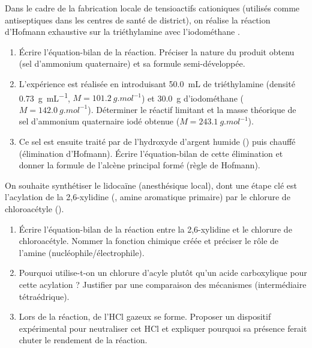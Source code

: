 \documentclass[11pt]{article}
\begin{document}
\begin{exercice}
Dans le cadre de la fabrication locale de tensioactifs cationiques (utilisés comme antiseptiques dans les centres de santé de district), on réalise la réaction d'Hofmann exhaustive sur la triéthylamine  avec l'iodométhane .
\begin{enumerate}
    \item Écrire l'équation-bilan de la réaction. Préciser la nature du produit obtenu (sel d'ammonium quaternaire) et sa formule semi-développée.
    \item L'expérience est réalisée en introduisant \SI{50,0}{mL} de triéthylamine (densité \SI{0,73}{g.mL^{-1}}, $M = \SI{101,2}{g.mol^{-1}}$) et \SI{30,0}{g} d'iodométhane ($M = \SI{142,0}{g.mol^{-1}}$). Déterminer le réactif limitant et la masse théorique de sel d'ammonium quaternaire iodé obtenue ($M = \SI{243,1}{g.mol^{-1}}$).
    \item Ce sel est ensuite traité par de l'hydroxyde d'argent humide () puis chauffé (élimination d'Hofmann). Écrire l'équation-bilan de cette élimination et donner la formule de l'alcène principal formé (règle de Hofmann).
\end{enumerate}
\end{exercice}

\begin{exercice}
On souhaite synthétiser le lidocaïne (anesthésique local), dont une étape clé est l'acylation de la 2,6-xylidine (, amine aromatique primaire) par le chlorure de chloroacétyle ().
\begin{enumerate}
    \item Écrire l'équation-bilan de la réaction entre la 2,6-xylidine et le chlorure de chloroacétyle. Nommer la fonction chimique créée et préciser le rôle de l'amine (nucléophile/électrophile).
    \item Pourquoi utilise-t-on un chlorure d'acyle plutôt qu'un acide carboxylique pour cette acylation ? Justifier par une comparaison des mécanismes (intermédiaire tétraédrique).
    \item Lors de la réaction, de l'HCl gazeux se forme. Proposer un dispositif expérimental pour neutraliser cet HCl et expliquer pourquoi sa présence ferait chuter le rendement de la réaction.
\end{enumerate}
\end{exercice}
\end{document}
